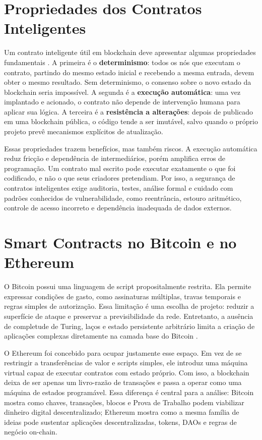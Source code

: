 \documentclass[12pt,a4paper]{report}
\begin{document}
\section{Propriedades dos Contratos Inteligentes}

Um contrato inteligente útil em blockchain deve apresentar algumas propriedades fundamentais \cite{Bashir2023}. A primeira é o \textbf{determinismo}: todos os nós que executam o contrato, partindo do mesmo estado inicial e recebendo a mesma entrada, devem obter o mesmo resultado. Sem determinismo, o consenso sobre o novo estado da blockchain seria impossível. A segunda é a \textbf{execução automática}: uma vez implantado e acionado, o contrato não depende de intervenção humana para aplicar sua lógica. A terceira é a \textbf{resistência a alterações}: depois de publicado em uma blockchain pública, o código tende a ser imutável, salvo quando o próprio projeto prevê mecanismos explícitos de atualização.

Essas propriedades trazem benefícios, mas também riscos. A execução automática reduz fricção e dependência de intermediários, porém amplifica erros de programação. Um contrato mal escrito pode executar exatamente o que foi codificado, e não o que seus criadores pretendiam. Por isso, a segurança de contratos inteligentes exige auditoria, testes, análise formal e cuidado com padrões conhecidos de vulnerabilidade, como reentrância, estouro aritmético, controle de acesso incorreto e dependência inadequada de dados externos.

\section{Smart Contracts no Bitcoin e no Ethereum}

O Bitcoin possui uma linguagem de script propositalmente restrita. Ela permite expressar condições de gasto, como assinaturas múltiplas, travas temporais e regras simples de autorização. Essa limitação é uma escolha de projeto: reduzir a superfície de ataque e preservar a previsibilidade da rede. Entretanto, a ausência de completude de Turing, laços e estado persistente arbitrário limita a criação de aplicações complexas diretamente na camada base do Bitcoin \cite{Bashir2023}.

O Ethereum foi concebido para ocupar justamente esse espaço. Em vez de se restringir a transferências de valor e scripts simples, ele introduz uma máquina virtual capaz de executar contratos com estado próprio. Com isso, a blockchain deixa de ser apenas um livro-razão de transações e passa a operar como uma máquina de estados programável. Essa diferença é central para a análise: Bitcoin mostra como chaves, transações, blocos e Prova de Trabalho podem viabilizar dinheiro digital descentralizado; Ethereum mostra como a mesma família de ideias pode sustentar aplicações descentralizadas, tokens, DAOs e regras de negócio on-chain.
\end{document}
